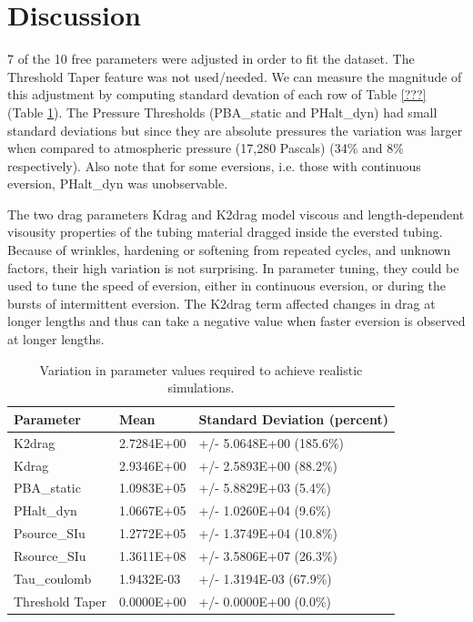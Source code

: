 \documentclass[letterpaper]{article}
\begin{document}
\section{Discussion}

7 of the 10 free parameters were adjusted in order to fit the dataset.
The Threshold Taper feature was not used/needed.
We can measure the magnitude of this adjustment by computing standard devation of
each row of Table \ref{???} (Table \ref{parStd}).
The Pressure Thresholds (PBA\_static and PHalt\_dyn) had small standard deviations
but since they are absolute pressures the variation was larger when compared
to atmospheric pressure (17,280 Pascals) (34\% and 8\% respectively).
Also note that for some eversions, i.e. those with continuous eversion,
PHalt\_dyn was unobservable.

The two drag parameters   Kdrag and K2drag model viscous and length-dependent visousity properties
of the tubing material dragged inside the eversted tubing.  Because of wrinkles,
hardening or softening from repeated cycles, and unknown factors, their high variation
is not surprising. In parameter tuning, they could be used to tune the speed of
eversion, either in continuous eversion, or during the bursts of intermittent eversion.
The K2drag term affected changes in drag at longer lengths and thus can take a
negative value when faster eversion is observed at longer lengths.

\begin{table}\centering
\begin{tabular}{l|l|l}
Parameter       & Mean       & Standard Deviation  (percent) \\\hline
K2drag          & 2.7284E+00 & +/- 5.0648E+00   (185.6\%)  \\
Kdrag           & 2.9346E+00 & +/- 2.5893E+00   (88.2\%)  \\
PBA\_static      & 1.0983E+05 & +/- 5.8829E+03 (5.4\%)  \\
PHalt\_dyn       & 1.0667E+05 & +/- 1.0260E+04  (9.6\%)  \\
Psource\_SIu     & 1.2772E+05 & +/- 1.3749E+04  (10.8\%)  \\
Rsource\_SIu     & 1.3611E+08 & +/- 3.5806E+07  (26.3\%)  \\
Tau\_coulomb     & 1.9432E-03 & +/- 1.3194E-03  (67.9\%)  \\
Threshold Taper  & 0.0000E+00 & +/- 0.0000E+00  (0.0\%)\\
\end{tabular}\label{parStd}
\caption{Variation in parameter values required to achieve realistic simulations.}
\end{table}
\end{document}

